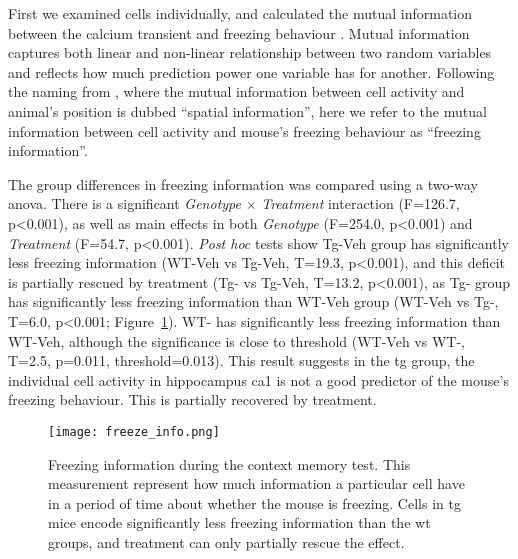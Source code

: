 First we examined cells individually, and calculated the mutual information between the calcium transient and freezing behaviour \citep{ross14, victor02}. Mutual information captures both linear and non-linear relationship between two random variables and reflects how much prediction power one variable has for another. Following the naming from \citet{skaggs93}, where the mutual information between cell activity and animal's position is dubbed ``spatial information'', here we refer to the mutual information between cell activity and mouse's freezing behaviour as ``freezing information''. 

The group differences in freezing information was compared using a two-way \gls{anova}. There is a significant \textit{Genotype} $\times$ \textit{Treatment} interaction (F=126.7, p<0.001), as well as main effects in both \textit{Genotype} (F=254.0, p<0.001) and \textit{Treatment} (F=54.7, p<0.001). \textit{Post hoc} tests show Tg-Veh group has significantly less freezing information (WT-Veh vs Tg-Veh, T=19.3, p<0.001), and this deficit is partially rescued by \tglu{} treatment (Tg-\glu{} vs Tg-Veh, T=13.2, p<0.001), as Tg-\glu{} group has significantly less freezing information than WT-Veh group (WT-Veh vs Tg-\glu, T=6.0, p<0.001; Figure~\ref{f.ad.freeze_info}). WT-\glu{} has significantly less freezing information than WT-Veh, although the significance is close to threshold (WT-Veh vs WT-\glu, T=2.5, p=0.011, threshold=0.013). This result suggests in the \gls{tg} group, the individual cell activity in hippocampus \gls{ca1} is not a good predictor of the mouse's freezing behaviour. This is partially recovered by \tglu{} treatment. 
\begin{figure}[h]
    \texttt{[image: freeze\_info.png]}
    \caption[Freezing information during memory test.]{Freezing information during the context memory test. This measurement represent how much information a particular cell have in a period of time about whether the mouse is freezing. Cells in \gls{tg} mice encode significantly less freezing information than the \gls{wt} groups, and \tglu{} treatment can only partially rescue the effect. \label{f.ad.freeze_info}}
\end{figure}
    


